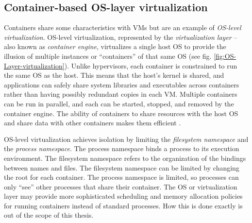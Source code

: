 \subsection{Container-based OS-layer virtualization}\label{OS-layer-virtualization}
Containers share some characteristics with VMs but are an example of \emph{OS-level virtualization}. OS-level virtualization, represented by the \emph{virtualization layer} -- also known as \emph{container engine}, virtualizes a single host OS to provide the illusion of multiple instances or ``containers'' of that same OS (see fig. \ref{fig:OS-Layer-virtualization}). Unlike hypervisors, each container is constrained to run the same OS as the host. This means that the host’s kernel is shared, and applications can safely share system libraries and executables across containers rather than having possibly redundant copies in each VM. Multiple containers can be run in parallel, and each can be started, stopped, and removed by the container engine. The ability of containers to share resources with the host OS and share data with other containers makes them efficient \cite{Mouat99117185791205503}\cite{redHatContainerTerms}. 

OS-level virtualization achieves isolation by limiting the \emph{filesystem namespace} and the \emph{process namespace}. The process namespace binds a process to its execution environment. The filesystem namespace refers to the organization of the bindings between names and files. The filesystem namespace can be limited by changing the root for each container. The process namespace is limited, so processes can only ``see'' other processes that share their container. The OS or virtualization layer may provide more sophisticated scheduling and memory allocation policies for running containers instead of standard processes. How this is done exactly is out of the scope of this thesis. 

